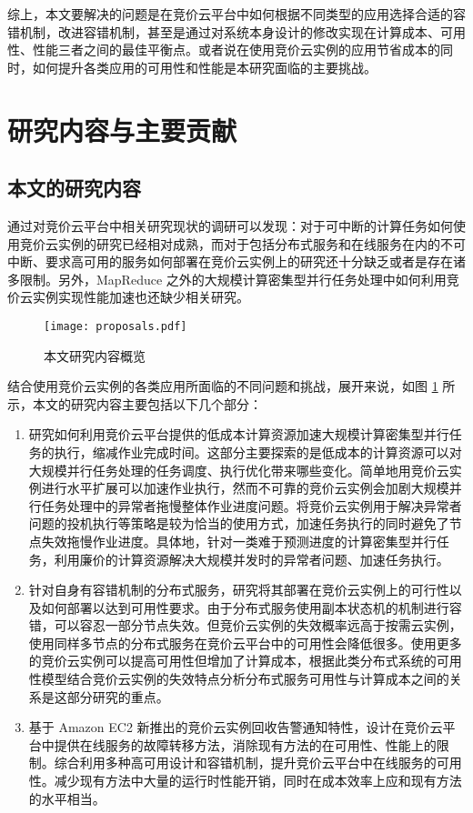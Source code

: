 综上，本文要解决的问题是在竞价云平台中如何根据不同类型的应用选择合适的容错机制，改进容错机制，甚至是通过对系统本身设计的修改实现在计算成本、可用性、性能三者之间的最佳平衡点。或者说在使用竞价云实例的应用节省成本的同时，如何提升各类应用的可用性和性能是本研究面临的主要挑战。

\section{研究内容与主要贡献}
\subsection{本文的研究内容}
通过对竞价云平台中相关研究现状的调研可以发现：对于可中断的计算任务如何使用竞价云实例的研究已经相对成熟，而对于包括分布式服务和在线服务在内的不可中断、要求高可用的服务如何部署在竞价云实例上的研究还十分缺乏或者是存在诸多限制。另外，MapReduce 之外的大规模计算密集型并行任务处理中如何利用竞价云实例实现性能加速也还缺少相关研究。
\begin{figure}
  \centering
  \texttt{[image: proposals.pdf]}
  \caption{本文研究内容概览}
  \label{figure:research_proposals}
\end{figure}

结合使用竞价云实例的各类应用所面临的不同问题和挑战，展开来说，如图 \ref{figure:research_proposals} 所示，本文的研究内容主要包括以下几个部分：
\begin{enumerate}
\item 研究如何利用竞价云平台提供的低成本计算资源加速大规模计算密集型并行任务的执行，缩减作业完成时间。这部分主要探索的是低成本的计算资源可以对大规模并行任务处理的任务调度、执行优化带来哪些变化。简单地用竞价云实例进行水平扩展可以加速作业执行，然而不可靠的竞价云实例会加剧大规模并行任务处理中的异常者拖慢整体作业进度问题。将竞价云实例用于解决异常者问题的投机执行等策略是较为恰当的使用方式，加速任务执行的同时避免了节点失效拖慢作业进度。具体地，针对一类难于预测进度的计算密集型并行任务，利用廉价的计算资源解决大规模并发时的异常者问题、加速任务执行。
\item 针对自身有容错机制的分布式服务，研究将其部署在竞价云实例上的可行性以及如何部署以达到可用性要求。由于分布式服务使用副本状态机的机制进行容错，可以容忍一部分节点失效。但竞价云实例的失效概率远高于按需云实例，使用同样多节点的分布式服务在竞价云平台中的可用性会降低很多。使用更多的竞价云实例可以提高可用性但增加了计算成本，根据此类分布式系统的可用性模型结合竞价云实例的失效特点分析分布式服务可用性与计算成本之间的关系是这部分研究的重点。
\item 基于 Amazon EC2 新推出的竞价云实例回收告警通知特性，设计在竞价云平台中提供在线服务的故障转移方法，消除现有方法的在可用性、性能上的限制。综合利用多种高可用设计和容错机制，提升竞价云平台中在线服务的可用性。减少现有方法中大量的运行时性能开销，同时在成本效率上应和现有方法的水平相当。
\end{enumerate}

